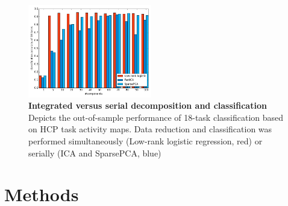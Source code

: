 \documentclass[10pt, conference, compsocconf]{IEEEtran}
\begin{document}
\begin{figure}
  \includegraphics[width=0.48\textwidth]{fig001}
  \caption {\textbf{Integrated versus serial decomposition and classification}\\
  Depicts the out-of-sample performance of 18-task classification based on
	HCP task activity maps. Data reduction and classification
	was performed simultaneously (Low-rank logistic regression, red) or serially
	(ICA and SparsePCA, blue)}
\end{figure}


%
\section{Methods}
%
\end{document}
